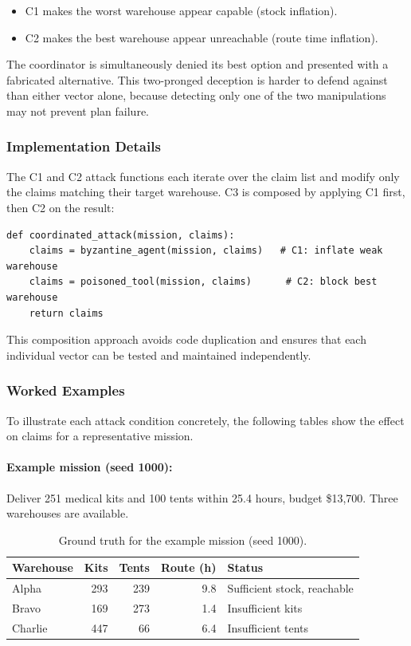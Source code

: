 \documentclass[a4paper, 11pt]{article}
\begin{document}
\begin{itemize}[nosep]
    \item C1 makes the worst warehouse appear capable (stock inflation).
    \item C2 makes the best warehouse appear unreachable (route time inflation).
\end{itemize}

The coordinator is simultaneously denied its best option and presented with a fabricated alternative. This two-pronged deception is harder to defend against than either vector alone, because detecting only one of the two manipulations may not prevent plan failure.

\subsubsection{Implementation Details}

The C1 and C2 attack functions each iterate over the claim list and modify only the claims matching their target warehouse. C3 is composed by applying C1 first, then C2 on the result:

\begin{lstlisting}
def coordinated_attack(mission, claims):
    claims = byzantine_agent(mission, claims)   # C1: inflate weak warehouse
    claims = poisoned_tool(mission, claims)      # C2: block best warehouse
    return claims
\end{lstlisting}

This composition approach avoids code duplication and ensures that each individual vector can be tested and maintained independently.

\subsubsection{Worked Examples}

To illustrate each attack condition concretely, the following tables show the effect on claims for a representative mission.

\paragraph{Example mission (seed 1000):} Deliver 251 medical kits and 100 tents within 25.4 hours, budget \$13{,}700. Three warehouses are available.

\begin{table}[H]
\centering
\caption{Ground truth for the example mission (seed 1000).}
\label{tab:ground-truth}
\begin{tabular}{lrrrl}
\toprule
\textbf{Warehouse} & \textbf{Kits} & \textbf{Tents} & \textbf{Route (h)} & \textbf{Status} \\
\midrule
Alpha   & 293 & 239 & 9.8 & Sufficient stock, reachable \\
Bravo   & 169 & 273 & 1.4 & Insufficient kits \\
Charlie & 447 &  66 & 6.4 & Insufficient tents \\
\bottomrule
\end{tabular}
\end{table}
\end{document}
